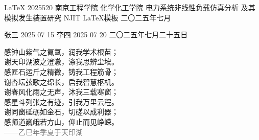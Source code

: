 \documentclass[a4paper]{njit}
\begin{document}

\cover
{\LaTeX}                         %
{2025520}                        %
{南京工程学院}                     %
{化学化工学院}                     %
{电力系统非线性负载仿真分析}               %
{及其模拟发生装置研究}                    %
{NJIT \quad \LaTeX 模板}          %
{}                               %
{二〇二五\hspace{0.4em}年\hspace{0.4em}七\hspace{0.4em}月} %



\thesisdeclaration
{张三}        %
{2025}        %
{07}          %
{15}          %
{李四}        %
{2025}        %
{07}          %
{20}          %
{二〇二五年七月二十五日} %
\newpage


\pagestyle{plain}
\pagestyle{fancy}







\clearpage

\clearpage

\thanking
{
  \begin{center}
    \begin{minipage}{0.8\textwidth}
        \centering
        
        感钟山紫气之氤氲，润我学术根苗；\\
        谢天印湖波之澄澈，涤我思辨尘埃。\\
        感匠石运斤之精微，铸我工程筋骨；\\
        谢杏坛弦歌之绵长，启我智慧枢机。\\[0.5em]
        
        谢春风化雨之无声，沐我三载寒窗；\\
        感星斗列张之有迹，引我万里云程。\\
        谢同窗砥砺如金石，切磋以成利器；\\
        感师道巍峨若方山，仰止而见峥嵘。\\[1em]
        
       \hfill \textcolor{gray}{——乙巳年季夏于天印湖}
    \end{minipage}
\end{center}
}
\end{document}
